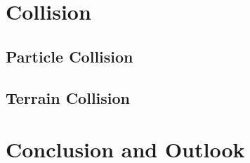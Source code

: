 \documentclass{sig-alternate-05-2015}
\begin{document}
\section{Collision}
\subsection{Particle Collision}
\subsection{Terrain Collision}
\section{Conclusion and Outlook}



 
\end{document}
